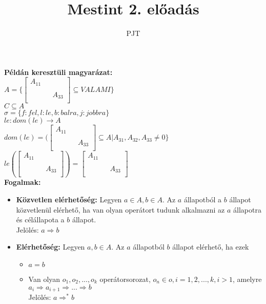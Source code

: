 \documentclass[a4paper, 12pt, fullpage]{article}
\author{PJT}
\title{Mestint 2. előadás}
\begin{document}
    \maketitle
    \textbf{Példán keresztüli magyarázat:}\\
    $A = \{\begin{bmatrix}
        A_{11} & & \\
        & & \\
        & & A_{33}\\
    \end{bmatrix} \subseteq VALAMI\}$\\
    $C \subseteq A$\\
    $\sigma = \{f: fel, l: le, b: balra, j: jobbra\}$\\
    $le: dom(le) \rightarrow A$\\
    $dom(le) = (\begin{bmatrix}
        A_{11} & &\\
        &&\\
        &&A_{33}\\
    \end{bmatrix} \subseteq A | A_{31}, A_{32}, A_{33} \neq 0\rbrace$\\
    $le(\begin{bmatrix}
        A_{11}&&\\
        &&\\
        &&A_{33}\\
    \end{bmatrix}) = \begin{bmatrix}
        A_{11}&&\\
        &&\\
        &&A_{33}\\
    \end{bmatrix}$\\
    \textbf{Fogalmak:}\\
    \begin{itemize}
        \item \textbf{Közvetlen elérhetőség:} Legyen $a \in A, b \in A$. Az $a$ állapotból a $b$ állapot közvetlenül elérhető, ha van olyan operátort tudunk alkalmazni az $a$ állapotra és célállapota a $b$ állapot.\\Jelölés: $a \Rightarrow b$
        \item \textbf{Elérhetőség:} Legyen $a,b \in A$. Az $a$ állapotból $b$ állapot elérhető, ha ezek\begin{itemize}
            \item $a = b$
            \item Van olyan $o_1, o_2, ..., o_k$ operátorsorozat, $o_n \in o, i=1,2,...,k, i > 1$, amelyre $a_i \Rightarrow a_{i+1} \Rightarrow ... \Rightarrow b$\\Jelölés: $a \Rightarrow^* b$
        \end{itemize}
    \end{itemize}
\end{document}
